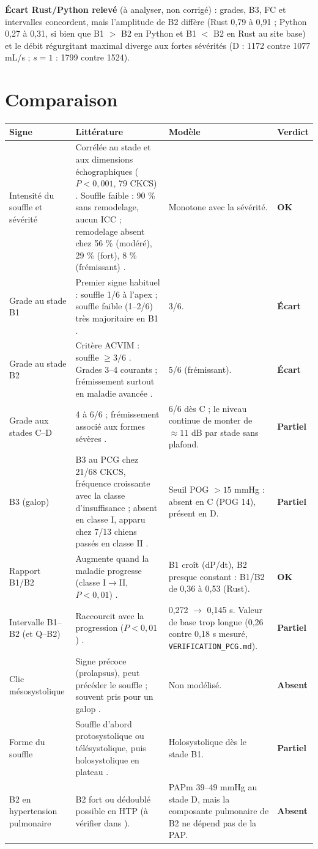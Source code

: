 \documentclass[10pt,a4paper]{article}
\newcommand{\ok}{\textcolor{green!45!black}{\textbf{OK}}}
\newcommand{\ecart}{\textcolor{red!70!black}{\textbf{Écart}}}
\newcommand{\partiel}{\textcolor{orange!80!black}{\textbf{Partiel}}}
\newcommand{\absent}{\textcolor{red!70!black}{\textbf{Absent}}}
\begin{document}
\textbf{Écart Rust/Python relevé} (à analyser, non corrigé) : grades, B3, FC et intervalles concordent, mais l'amplitude de B2 diffère (Rust 0,79 à 0,91 ; Python 0,27 à 0,31, si bien que B1 $>$ B2 en Python et B1 $<$ B2 en Rust au site base) et le débit régurgitant maximal diverge aux fortes sévérités (D : \num{1172} contre \num{1077} mL/s ; $s=1$ : \num{1799} contre \num{1524}).

\section{Comparaison}
\begin{tabularx}{\linewidth}{p{3.2cm}LLp{1.3cm}}
\toprule
Signe & Littérature & Modèle & Verdict\\
\midrule
Intensité du souffle et sévérité &
Corrélée au stade et aux dimensions échographiques ($P<0{,}001$, 79 CKCS) \cite{haggstrom1995}. Souffle faible : 90 \% sans remodelage, aucun ICC ; remodelage absent chez 56 \% (modéré), 29 \% (fort), 8 \% (frémissant) \cite{ljungvall2014}. &
Monotone avec la sévérité. & \ok\\
Grade au stade B1 &
Premier signe habituel : souffle 1/6 à l'apex ; souffle faible (1--2/6) très majoritaire en B1 \cite{ljungvall2014}. &
3/6. & \ecart\\
Grade au stade B2 &
Critère ACVIM : souffle $\ge 3/6$ \cite{keene2019}. Grades 3--4 courants ; frémissement surtout en maladie avancée \cite{ljungvall2014}. &
5/6 (frémissant). & \ecart\\
Grade aux stades C--D &
4 à 6/6 ; frémissement associé aux formes sévères \cite{ljungvall2014}. &
6/6 dès C ; le niveau continue de monter de $\approx 11$ dB par stade sans plafond. & \partiel\\
B3 (galop) &
B3 au PCG chez 21/68 CKCS, fréquence croissante avec la classe d'insuffisance ; absent en classe I, apparu chez 7/13 chiens passés en classe II \cite{haggstrom1995}. &
Seuil POG $>15$ mmHg : absent en C (POG 14), présent en D. & \partiel\\
Rapport B1/B2 &
Augmente quand la maladie progresse (classe I$\to$II, $P<0{,}01$) \cite{haggstrom1995}. &
B1 croît (dP/dt), B2 presque constant : B1/B2 de 0,36 à 0,53 (Rust). & \ok\\
Intervalle B1--B2 (et Q--B2) &
Raccourcit avec la progression ($P<0{,}01$) \cite{haggstrom1995}. &
0,272 $\to$ 0,145 s. Valeur de base trop longue (0,26 contre 0,18 s mesuré, \texttt{VERIFICATION\_PCG.md}). & \partiel\\
Clic mésosystolique &
Signe précoce (prolapsus), peut précéder le souffle ; souvent pris pour un galop \cite{vinrush}. &
Non modélisé. & \absent\\
Forme du souffle &
Souffle d'abord protosystolique ou télésystolique, puis holosystolique en plateau \cite{vinrush}. &
Holosystolique dès le stade B1. & \partiel\\
B2 en hypertension pulmonaire &
B2 fort ou dédoublé possible en HTP (à vérifier dans \cite{reinero2020}). &
PAPm 39--49 mmHg au stade D, mais la composante pulmonaire de B2 ne dépend pas de la PAP. & \absent\\
\bottomrule
\end{tabularx}
\end{document}
